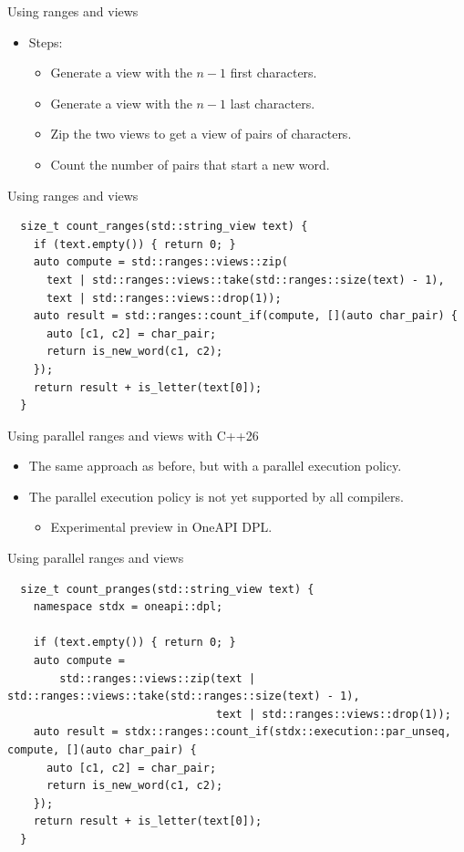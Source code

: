 \begin{frame}[t,fragile]{Using ranges and views}
\begin{itemize}
  \item Steps:
    \begin{itemize}
      \item Generate a view with the $n-1$ first characters.
      \item Generate a view with the $n-1$ last characters.
      \item Zip the two views to get a view of pairs of characters.
      \item Count the number of pairs that start a new word.
    \end{itemize}
\end{itemize}

\begin{block}{Using ranges and views}
\begin{lstlisting}
  size_t count_ranges(std::string_view text) {
    if (text.empty()) { return 0; }
    auto compute = std::ranges::views::zip(
      text | std::ranges::views::take(std::ranges::size(text) - 1),
      text | std::ranges::views::drop(1));
    auto result = std::ranges::count_if(compute, [](auto char_pair) {
      auto [c1, c2] = char_pair;
      return is_new_word(c1, c2);
    });
    return result + is_letter(text[0]);
  }
\end{lstlisting}
\end{block}
\end{frame}

\begin{frame}[t,fragile]{Using parallel ranges and views with C++26}
\begin{itemize}
  \item The same approach as before, but with a parallel execution policy.
  \item {} The parallel execution policy is not yet supported by all compilers.
    \begin{itemize}
      \item Experimental preview in OneAPI DPL.
    \end{itemize}
\end{itemize}

\begin{block}{Using parallel ranges and views}
\begin{lstlisting}
  size_t count_pranges(std::string_view text) {
    namespace stdx = oneapi::dpl;

    if (text.empty()) { return 0; }
    auto compute =
        std::ranges::views::zip(text | std::ranges::views::take(std::ranges::size(text) - 1),
                                text | std::ranges::views::drop(1));
    auto result = stdx::ranges::count_if(stdx::execution::par_unseq, compute, [](auto char_pair) {
      auto [c1, c2] = char_pair;
      return is_new_word(c1, c2);
    });
    return result + is_letter(text[0]);
  }
\end{lstlisting}
\end{block}
\end{frame}